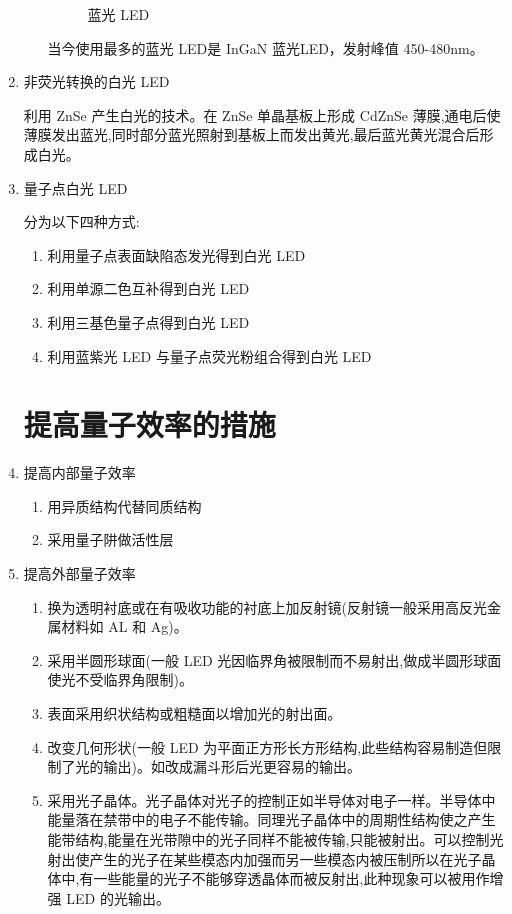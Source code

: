 \begin{enumerate}
\begin{enumerate}
\begin{figure}[h]
\caption{蓝光 LED \label{fluoled3}}
\end{figure}

\CJKindent 当今使用最多的蓝光 LED是 InGaN 蓝光LED，发射峰值 450-480nm\cite{fluoled}。

\end{enumerate}
\item 非荧光转换的白光 LED\cite{powerled2}

	\CJKindent 利用 ZnSe 产生白光的技术。在 ZnSe 单晶基板上形成 CdZnSe 薄膜,通电后使薄膜发出蓝光,同时部分蓝光照射到基板上而发出黄光,最后蓝光黄光混合后形成白光。

\item 量子点白光 LED \cite{powerled2}

	\CJKindent 分为以下四种方式:
	\begin{enumerate}

\item 利用量子点表面缺陷态发光得到白光 LED

	\item 利用单源二色互补得到白光 LED

	\item 利用三基色量子点得到白光 LED

	\item 利用蓝紫光 LED 与量子点荧光粉组合得到白光 LED

	\end{enumerate}

\section{提高量子效率的措施\cite{powerled2}}
\item 提高内部量子效率
\begin{enumerate}
	\item 用异质结构代替同质结构
	\item 采用量子阱做活性层
\end{enumerate}

	\item 提高外部量子效率
\begin{enumerate}
	\item 换为透明衬底或在有吸收功能的衬底上加反射镜(反射镜一般采用高反光金属材料如 AL 和 Ag)。
	\item 采用半圆形球面(一般 LED 光因临界角被限制而不易射出,做成半圆形球面使光不受临界角限制)。
	\item 表面采用织状结构或粗糙面以增加光的射出面。
	\item 改变几何形状(一般 LED 为平面正方形长方形结构,此些结构容易制造但限制了光的输出)。如改成漏斗形后光更容易的输出。
	\item 采用光子晶体。光子晶体对光子的控制正如半导体对电子一样。半导体中能量落在禁带中的电子不能传输。同理光子晶体中的周期性结构使之产生能带结构,能量在光带隙中的光子同样不能被传输,只能被射出。可以控制光射出使产生的光子在某些模态内加强而另一些模态内被压制所以在光子晶体中,有一些能量的光子不能够穿透晶体而被反射出,此种现象可以被用作增强 LED 的光输出。
\end{enumerate}



\end{enumerate}
